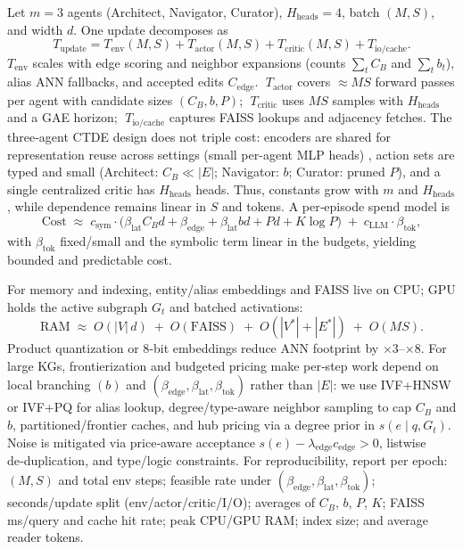 \documentclass{article} %
\begin{document}
Let $m{=}3$ agents (Architect, Navigator, Curator), $H_{\text{heads}}{=}4$, batch $(M,S)$, and width $d$. One update decomposes as
\[
T_{\text{update}}
= T_{\text{env}}(M,S) + T_{\text{actor}}(M,S) + T_{\text{critic}}(M,S) + T_{\text{io/cache}}.
\]
$T_{\text{env}}$ scales with edge scoring and neighbor expansions (counts $\sum_t C_B$ and $\sum_t b_t$), alias ANN fallbacks, and accepted edits $C_{\text{edge}}$. $\;T_{\text{actor}}$ covers $\approx MS$ forward passes per agent with candidate sizes $(C_B,b,P)$; $\;T_{\text{critic}}$ uses $MS$ samples with $H_{\text{heads}}$ and a GAE horizon; $\;T_{\text{io/cache}}$ captures FAISS lookups and adjacency fetches. The three‑agent CTDE design does not triple cost: encoders are shared for representation reuse across settings (small per-agent MLP heads) \citep{zhou2025self}, action sets are typed and small (Architect: $C_B\!\ll\!|E|$; Navigator: $b$; Curator: pruned $P$), and a single centralized critic has $H_{\text{heads}}$ heads. Thus, constants grow with $m$ and $H_{\text{heads}}$, while dependence remains linear in $S$ and tokens. A per‑episode spend model is
\[
\mathrm{Cost}\;\approx\;
c_{\text{sym}}\!\cdot\!\big(\beta_{\text{lat}} C_B d + \beta_{\text{edge}} + \beta_{\text{lat}} b d + P d + K\log P\big)
\;+\;
c_{\text{LLM}}\!\cdot\! \beta_{\text{tok}},
\]
with $\beta_{\text{tok}}$ fixed/small and the symbolic term linear in the budgets, yielding bounded and predictable cost.


For memory and indexing, entity/alias embeddings and FAISS live on CPU; GPU holds the active subgraph $G_t$ and batched activations:
\[
\text{RAM}\;\approx\;O(|V|\,d)\;+\;O(\text{FAISS})\;+\;O(|V^\ast|{+}|E^\ast|)\;+\;O(MS).
\]
Product quantization or 8‑bit embeddings reduce ANN footprint by $\times 3$–$\times 8$. For large KGs, frontierization and budgeted pricing make per‑step work depend on local branching $(b)$ and $(\beta_{\text{edge}},\beta_{\text{lat}},\beta_{\text{tok}})$ rather than $|E|$: we use IVF{+}HNSW or IVF{+}PQ for alias lookup, degree/type‑aware neighbor sampling to cap $C_B$ and $b$, partitioned/frontier caches, and hub pricing via a degree prior in $s(e\mid q,G_t)$. Noise is mitigated via price‑aware acceptance $s(e)-\lambda_{\text{edge}}c_{\text{edge}}{>}0$, listwise de‑duplication, and type/logic constraints. For reproducibility, report per epoch: $(M,S)$ and total env steps; feasible rate under $(\beta_{\text{edge}},\beta_{\text{lat}},\beta_{\text{tok}})$; seconds/update split (env/actor/critic/I/O); averages of $C_B$, $b$, $P$, $K$; FAISS ms/query and cache hit rate; peak CPU/GPU RAM; index size; and average reader tokens.
\end{document}
